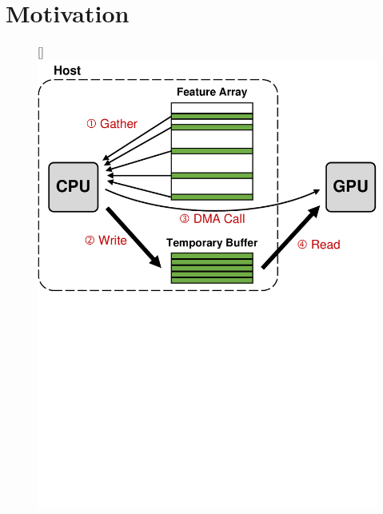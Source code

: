 \section{Motivation}


\begin{figure}[!htbp]\captionsetup[subfigure]{font=small}
\centering
{}
[\linewidth]{\includegraphics[scale=0.55]{figures/PyDArXiv/design_comparison_baseline.pdf}}

\end{figure}
